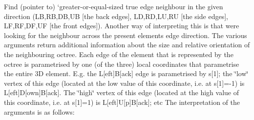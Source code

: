 Find (pointer to) `greater-\/or-\/equal-\/sized true edge neighbour\textquotesingle{} in the given direction (LB,RB,DB,UB \mbox{[}the back edges\mbox{]}, LD,RD,LU,RU \mbox{[}the side edges\mbox{]}, LF,RF,DF,UF \mbox{[}the front edges\mbox{]}). Another way of interpreting this is that we\textquotesingle{}re looking for the neighbour across the present element\textquotesingle{}s edge \textquotesingle{}direction\textquotesingle{}. The various arguments return additional information about the size and relative orientation of the neighbouring octree. Each edge of the element that is represented by the octree is parametrised by one (of the three) local coordinates that parametrise the entire 3D element. E.\+g. the L\mbox{[}eft\mbox{]}B\mbox{[}ack\mbox{]} edge is parametrised by s\mbox{[}1\mbox{]}; the \char`\"{}low\char`\"{} vertex of this edge (located at the low value of this coordinate, i.\+e. at s\mbox{[}1\mbox{]}=-\/1) is L\mbox{[}eft\mbox{]}D\mbox{[}own\mbox{]}B\mbox{[}ack\mbox{]}. The \char`\"{}high\char`\"{} vertex of this edge (located at the high value of this coordinate, i.\+e. at s\mbox{[}1\mbox{]}=1) is L\mbox{[}eft\mbox{]}U\mbox{[}p\mbox{]}B\mbox{[}ack\mbox{]}; etc The interpretation of the arguments is as follows\+:
